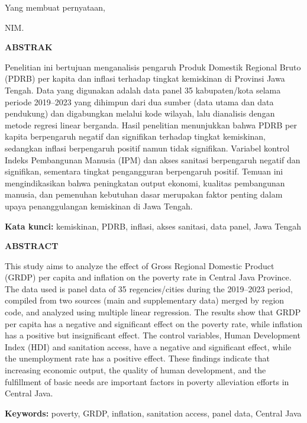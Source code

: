 \vspace{0.3cm}
\noindent\hfill Yang membuat pernyataan,

\vspace{2.5cm}
\noindent\hfill \underline{\NamaMahasiswa}

\noindent\hfill NIM. \NIM

\clearpage
\begin{center}
\textbf{ABSTRAK}
\end{center}
\vspace{0.5cm}
\begin{singlespace}
\noindent Penelitian ini bertujuan menganalisis pengaruh Produk Domestik Regional
Bruto (PDRB) per kapita dan inflasi terhadap tingkat kemiskinan di Provinsi Jawa
Tengah. Data yang digunakan adalah data panel 35 kabupaten/kota selama periode
2019--2023 yang dihimpun dari dua sumber (data utama dan data pendukung) dan
digabungkan melalui kode wilayah, lalu dianalisis dengan metode regresi linear
berganda. Hasil penelitian menunjukkan bahwa PDRB per kapita berpengaruh negatif dan
signifikan terhadap tingkat kemiskinan, sedangkan inflasi berpengaruh positif namun
tidak signifikan. Variabel kontrol Indeks Pembangunan Manusia (IPM) dan akses sanitasi
berpengaruh negatif dan signifikan, sementara tingkat pengangguran berpengaruh positif.
Temuan ini mengindikasikan bahwa peningkatan output ekonomi, kualitas pembangunan
manusia, dan pemenuhan kebutuhan dasar merupakan faktor penting dalam upaya
penanggulangan kemiskinan di Jawa Tengah.

\vspace{0.5cm}
\noindent\textbf{Kata kunci:} kemiskinan, PDRB, inflasi, akses sanitasi, data panel, Jawa Tengah
\end{singlespace}

\clearpage
\begin{center}
\textbf{ABSTRACT}
\end{center}
\vspace{0.5cm}
\begin{singlespace}
\noindent This study aims to analyze the effect of Gross Regional Domestic Product
(GRDP) per capita and inflation on the poverty rate in Central Java Province. The
data used is panel data of 35 regencies/cities during the 2019--2023 period, compiled
from two sources (main and supplementary data) merged by region code, and analyzed
using multiple linear regression. The results show that GRDP per capita has a negative
and significant effect on the poverty rate, while inflation has a positive but
insignificant effect. The control variables, Human Development Index (HDI) and
sanitation access, have a negative and significant effect, while the unemployment rate
has a positive effect. These findings indicate that increasing economic output, the
quality of human development, and the fulfillment of basic needs are important factors
in poverty alleviation efforts in Central Java.

\vspace{0.5cm}
\noindent\textbf{Keywords:} poverty, GRDP, inflation, sanitation access, panel data, Central Java
\end{singlespace}

